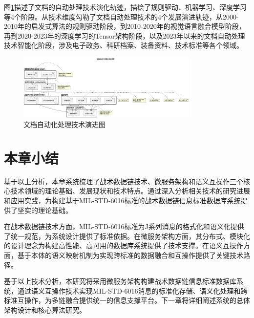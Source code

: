 图\ref{fig_document_processing_evolution}描述了文档的自动处理技术演化轨迹，描绘了规则驱动、机器学习、深度学习等4个阶段。从技术维度勾勒了文档自动处理技术的4个发展演进轨迹，从2000-2010年的启发式算法的规则驱动阶段，到2010-2020年的视觉语言融合模型阶段，再到2020-2023年的深度学习的Tensor架构阶段，以及2023年以来的文档自动处理技术智能化阶段，涉及电子政务、科研档案、装备资料、技术标准等各个领域。

\begin{figure}[H]
    \centering
    \includegraphics[width=0.8\textwidth,height=0.6\textheight,keepaspectratio]{chapters/fig-0/document_processing_evolution.png}
    \caption{文档自动化处理技术演进图}
    \label{fig_document_processing_evolution}
\end{figure}

\section{本章小结}

基于以上分析，本章系统梳理了战术数据链技术、微服务架构和语义互操作三个核心技术领域的理论基础、发展现状和技术特点。通过深入分析相关技术的研究进展和应用实践，为构建基于MIL-STD-6016标准的战术数据链信息标准数据库系统提供了坚实的理论基础。

在战术数据链技术方面，MIL-STD-6016标准为J系列消息的格式化和语义化提供了统一规范，为系统设计提供了标准依据。在微服务架构方面，其分布式、模块化的设计理念为构建高性能、高可用的数据库系统提供了技术支撑。在语义互操作方面，基于本体的语义映射机制为实现跨标准的数据融合和互操作提供了关键技术路径。

基于以上技术分析，本研究将采用微服务架构构建战术数据链信息标准数据库系统，通过语义互操作技术实现MIL-STD-6016消息的标准化存储、语义化处理和跨标准互操作，为多链融合提供统一的信息支撑平台。下一章将详细阐述系统的总体架构设计和核心算法研究。

